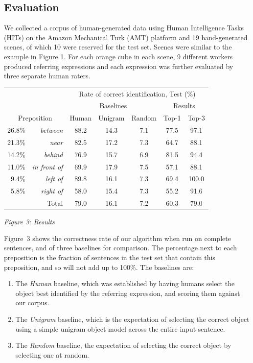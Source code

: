 \documentclass[landscape,a0b]{a0poster}
\numberwithin{equation}{section}
\begin{document}
\begin{multicols*}{3}
\section{Evaluation} 

We collected a corpus of human-generated data using Human Intelligence Tasks (HITs) on the Amazon Mechanical Turk (AMT) platform and 19 hand-generated scenes, of which 10 were reserved for the test set. Scenes were similar to the example in Figure 1.  For each orange cube in each scene, 9 different workers produced  referring expressions and each expression was further evaluated by three separate human raters. 

\begin{center}
  \begin{tabular}{| r r | c | c | c || c c |} \hline
     & & \multicolumn{5}{c|}{Rate of correct identification, Test (\%)} \\
     & & \multicolumn{3}{c||}{Baselines} & \multicolumn{2}{c|}{Results} \\
     \multicolumn{2}{|c|}{Preposition}
			                      &   Human & Unigram & Random &  Top-1 & Top-3 \\\hline
26.8\% & \textit{between}       & 88.2  & 14.3  & 7.1   & 77.5  & 97.1 \\
21.3\% & \textit{near}          & 82.5  & 17.2  & 7.3   & 64.7  & 88.1 \\
14.2\% & \textit{behind}        & 76.9  & 15.7  & 6.9   & 81.5  & 94.4 \\
11.0\% & \textit{in front of}   & 69.9  & 17.9  & 7.5   & 57.1  & 88.1 \\
9.4\% & \textit{left of}        & 89.8  & 16.1  & 7.3   & 69.4  & 100.0 \\
5.8\% & \textit{right of}       & 58.0  & 15.4  & 7.3   & 55.2  & 91.6 \\\hline\hline
    \multicolumn{2}{|r|}{Total} & 79.0  & 16.1  & 7.2   & 60.3  & 79.0 \\\hline
  \end{tabular}
  
\textit{Figure 3: Results}
\end{center}

Figure~3 shows the correctness rate of our algorithm when run on complete sentences, and of three baselines for comparison. The percentage next to each preposition is the fraction of sentences in the test set that contain this preposition, and so will not add up to 100\%. The baselines are:
\begin{enumerate}[topsep=0pt,itemsep=-1ex,partopsep=1ex,parsep=1ex]
	\item The \emph{Human} baseline, which was established by having humans select the object best identified by the referring expression, and scoring them against our corpus.
	\item The \emph{Unigram} baseline, which is the expectation of selecting the correct object using a simple unigram object model across the entire input sentence.
	\item The \emph{Random} baseline, the expectation of selecting the correct object by selecting one at random.
\end{enumerate}


\end{multicols*}
\end{document}
